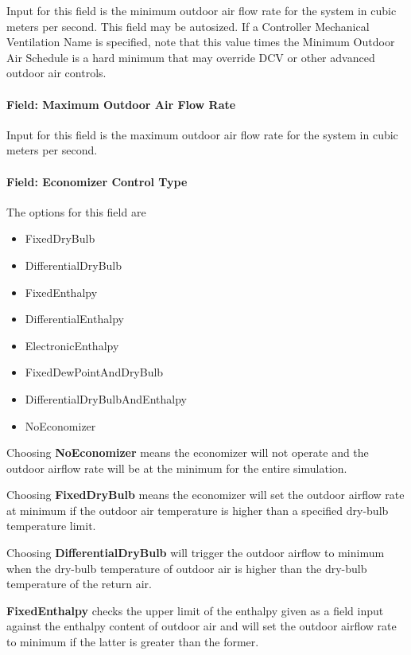 Input for this field is the minimum outdoor air flow rate for the system in cubic meters per second. This field may be autosized. If a Controller Mechanical Ventilation Name is specified, note that this value times the Minimum Outdoor Air Schedule is a hard minimum that may override DCV or other advanced outdoor air controls.

\paragraph{Field: Maximum Outdoor Air Flow Rate}\label{field-maximum-outdoor-air-flow-rate}

Input for this field is the maximum outdoor air flow rate for the system in cubic meters per second.

\paragraph{Field: Economizer Control Type}\label{field-economizer-control-type}

The options for this field are

\begin{itemize}
\item
  FixedDryBulb
\item
  DifferentialDryBulb
\item
  FixedEnthalpy
\item
  DifferentialEnthalpy
\item
  ElectronicEnthalpy
\item
  FixedDewPointAndDryBulb
\item
  DifferentialDryBulbAndEnthalpy
\item
  NoEconomizer
\end{itemize}

Choosing \textbf{NoEconomizer} means the economizer will not operate and the outdoor airflow rate will be at the minimum for the entire simulation.

Choosing \textbf{FixedDryBulb} means the economizer will set the outdoor airflow rate at minimum if the outdoor air temperature is higher than a specified dry-bulb temperature limit.

Choosing \textbf{DifferentialDryBulb} will trigger the outdoor airflow to minimum when the dry-bulb temperature of outdoor air is higher than the dry-bulb temperature of the return air.

\textbf{FixedEnthalpy} checks the upper limit of the enthalpy given as a field input against the enthalpy content of outdoor air and will set the outdoor airflow rate to minimum if the latter is greater than the former.

